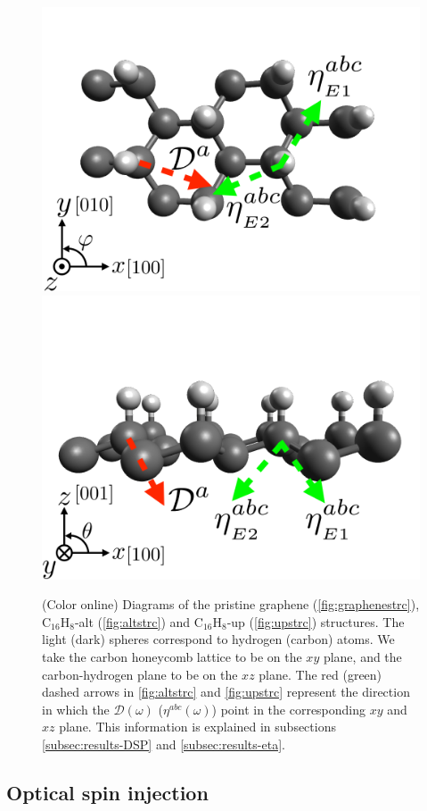 \documentclass[pss]{wiley2sp} %
\begin{document}
\begin{figure}[t]
{\includegraphics[width=0.49\linewidth]{figures/images/up1}
\includegraphics[width=0.49\linewidth]{figures/images/up2}
\label{fig:upstrc}}
\caption{(Color online) Diagrams of the pristine graphene 
(\ref{fig:graphenestrc}), C$_{16}$H$_{8}$-alt (\ref{fig:altstrc}) and 
C$_{16}$H$_{8}$-up (\ref{fig:upstrc}) structures. The light (dark) spheres 
correspond to hydrogen (carbon) atoms. We take the carbon honeycomb lattice to 
be on the $xy$ plane, and the carbon-hydrogen plane to be on the $xz$ plane. 
The red (green) dashed arrows in \ref{fig:altstrc} and \ref{fig:upstrc}
represent the direction in which the $\mathcal{D}(\omega)$ ($\eta^{abc}(\omega)$) 
point in the corresponding $xy$ and $xz$ plane. This information is explained 
in subsections \ref{subsec:results-DSP} and \ref{subsec:results-eta}. 
\label{fig:structures}}
\end{figure}


\subsection{Optical spin injection}
\end{document}
